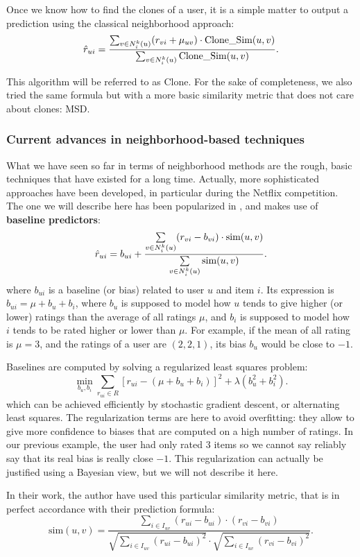 \noindent
Once we know how to find the clones of a user, it is a simple matter to output
a prediction using the classical neighborhood approach:
$$\hat{r}_{ui} = \frac{\sum_{v \in N_i^k(u)} (r_{vi} + \mu_{uv}) \cdot \text{Clone\_Sim}(u,
v)}{\sum_{v \in N_i^k(u)} \text{Clone\_Sim}(u, v)}.$$

This algorithm will be referred to as Clone. For the sake of completeness, we
also tried the same formula but with a more basic similarity metric that does
not care about clones: MSD.

\subsubsection{Current advances in neighborhood-based techniques}

What we have seen so far in terms of neighborhood methods are the rough, basic
techniques that have existed for a long time. Actually, more sophisticated
approaches have been developed, in particular during the Netflix competition.
The one we will describe here has been popularized in \cite{BelKorSIGKDD2007},
and makes use of \textbf{baseline predictors}:
$$\hat{r}_{ui} = b_{ui} + \frac{\sum\limits_{v \in N_i^k(u)} (r_{vi} - b_{vi})
\cdot \text{sim}(u, v)} {\sum\limits_{v \in N_i^k(u)}\text{sim}(u, v)}.$$
where $b_{ui}$ is a baseline (or bias) related to user $u$ and item $i$. Its
expression is $b_{ui} = \mu + b_u + b_i$, where $b_u$ is supposed to model how
$u$ tends to give higher (or lower) ratings than the average of all ratings
$\mu$, and $b_i$ is supposed to model how $i$ tends to be rated higher or lower
than $\mu$. For example, if the mean of all rating is $\mu = 3$, and the
ratings of a user are $(2, 2, 1)$, its bias $b_u$ would be close to $-1$.

Baselines are computed by solving a regularized least squares problem:
$$\min_{b_u, b_i} \sum_{r_{ui} \in R} \left[r_{ui} - (\mu + b_u + b_i)\right]^2
+ \lambda \left(b_u^2 + b_i^2 \right).$$
which can be achieved efficiently by stochastic gradient descent, or
alternating least squares. The regularization terms are here to avoid
overfitting: they allow to give more confidence to biases that are computed on
a high number of ratings. In our previous example, the user had only rated $3$
items so we cannot say reliably say that its real bias is really close $-1$.
This regularization can actually be justified using a Bayesian view, but we
will not describe it here.

In their work, the author have used this particular similarity metric, that is
in perfect accordance with their prediction formula:
$$\text{sim}(u, v) = \frac
{ \sum\limits_{i \in I_{uv}} (r_{ui} -  b_{ui}) \cdot (r_{vi} - b_{vi})}
{\sqrt{\sum\limits_{i \in I_{uv}} (r_{ui} -  b_{ui})^2} \cdot
\sqrt{\sum\limits_{i \in I_{uv}} (r_{vi} -  b_{vi})^2}}.$$

